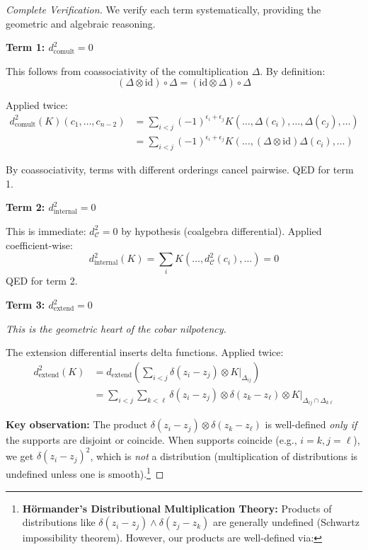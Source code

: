 \begin{proof}[Complete Verification]
We verify each term systematically, providing the geometric and algebraic reasoning.

\textbf{Term 1: $d_{\text{comult}}^2 = 0$}

This follows from coassociativity of the comultiplication $\Delta$. By definition:
$$(\Delta \otimes \text{id}) \circ \Delta = (\text{id} \otimes \Delta) \circ \Delta$$

Applied twice:
\begin{align*}
d_{\text{comult}}^2(K)(c_1, \ldots, c_{n-2}) &= \sum_{i < j} (-1)^{\epsilon_i + 
\epsilon_j} K(\ldots, \Delta(c_i), \ldots, \Delta(c_j), \ldots) \\
&= \sum_{i < j} (-1)^{\epsilon_i + \epsilon_j} K(\ldots, (\Delta \otimes \text{id})
\Delta(c_i), \ldots)
\end{align*}

By coassociativity, terms with different orderings cancel pairwise. QED for term 1.

\textbf{Term 2: $d_{\text{internal}}^2 = 0$}

This is immediate: $d_{\mathcal{C}}^2 = 0$ by hypothesis (coalgebra differential). 
Applied coefficient-wise:
$$d_{\text{internal}}^2(K) = \sum_i K(\ldots, d_{\mathcal{C}}^2(c_i), \ldots) = 0$$
QED for term 2.

\textbf{Term 3: $d_{\text{extend}}^2 = 0$}

\emph{This is the geometric heart of the cobar nilpotency.}

The extension differential inserts delta functions. Applied twice:
\begin{align*}
d_{\text{extend}}^2(K) &= d_{\text{extend}}\left(\sum_{i<j} \delta(z_i - z_j) \otimes 
K|_{\Delta_{ij}}\right) \\
&= \sum_{i<j} \sum_{k<\ell} \delta(z_i - z_j) \otimes \delta(z_k - z_\ell) \otimes 
K|_{\Delta_{ij} \cap \Delta_{k\ell}}
\end{align*}

\textbf{Key observation:} The product $\delta(z_i - z_j) \otimes \delta(z_k - z_\ell)$ 
is well-defined \emph{only if} the supports are disjoint or coincide. When supports 
coincide (e.g., $i=k, j=\ell$), we get $\delta(z_i - z_j)^2$, which is \emph{not} 
a distribution (multiplication of distributions is undefined unless one is smooth).\footnote{%
\textbf{Hörmander's Distributional Multiplication Theory:} Products of distributions like 
$\delta(z_i - z_j) \wedge \delta(z_j - z_k)$ are generally undefined (Schwartz impossibility 
theorem). However, our products are well-defined via:

}
\end{proof}
